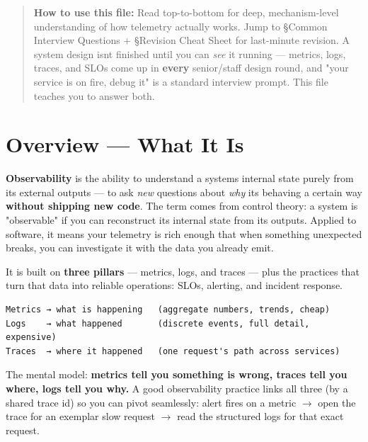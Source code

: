 \documentclass[11pt]{article}
\begin{document}
\makecoverpage

\thispagestyle{empty}
{\hypersetup{hidelinks}\tableofcontents}
\clearpage

\begin{quote}
\textbf{How to use this file:} Read top-to-bottom for deep, mechanism-level understanding of how telemetry actually works. Jump to §Common Interview Questions + §Revision Cheat Sheet for last-minute revision. A system design isn\textquotesingle t finished until you can \emph{see} it running --- metrics, logs, traces, and SLOs come up in \textbf{every} senior/staff design round, and "your service is on fire, debug it" is a standard interview prompt. This file teaches you to answer both.
\end{quote}

\section{Overview --- What It Is}\label{overview--what-it-is}

\textbf{Observability} is the ability to understand a system\textquotesingle s internal state purely from its external outputs --- to ask \emph{new} questions about \emph{why} it\textquotesingle s behaving a certain way \textbf{without shipping new code}. The term comes from control theory: a system is "observable" if you can reconstruct its internal state from its outputs. Applied to software, it means your telemetry is rich enough that when something unexpected breaks, you can investigate it with the data you already emit.

It is built on \textbf{three pillars} --- metrics, logs, and traces --- plus the practices that turn that data into reliable operations: SLOs, alerting, and incident response.

\setcodelang{}

\begin{verbatim}
Metrics → what is happening   (aggregate numbers, trends, cheap)
Logs    → what happened       (discrete events, full detail, expensive)
Traces  → where it happened   (one request's path across services)
\end{verbatim}

The mental model: \textbf{metrics tell you something is wrong, traces tell you where, logs tell you why.} A good observability practice links all three (by a shared trace id) so you can pivot seamlessly: alert fires on a metric \(\rightarrow\) open the trace for an exemplar slow request \(\rightarrow\) read the structured logs for that exact request.
\end{document}
